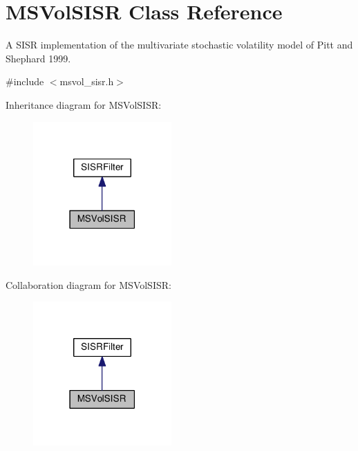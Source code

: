 \hypertarget{classMSVolSISR}{}\section{M\+S\+Vol\+S\+I\+SR Class Reference}
\label{classMSVolSISR}


A S\+I\+SR implementation of the multivariate stochastic volatility model of Pitt and Shephard 1999.  




{\ttfamily \#include $<$msvol\+\_\+sisr.\+h$>$}



Inheritance diagram for M\+S\+Vol\+S\+I\+SR\+:\nopagebreak
\begin{figure}[H]
\begin{center}
\leavevmode
\includegraphics[width=150pt]{classMSVolSISR__inherit__graph}
\end{center}
\end{figure}


Collaboration diagram for M\+S\+Vol\+S\+I\+SR\+:\nopagebreak
\begin{figure}[H]
\begin{center}
\leavevmode
\includegraphics[width=150pt]{classMSVolSISR__coll__graph}
\end{center}
\end{figure}

